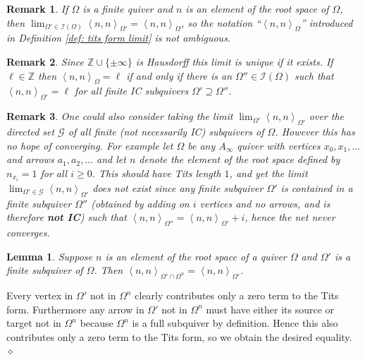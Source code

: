 \documentclass{article}
\newcommand{\ZZ}{\mathbb{Z}}
\newcommand{\bracket}[1]{\left \langle #1 \right\rangle}
\newtheorem{lemma}{Lemma}[section]
\newtheorem{remark}{Remark}[section]
\newenvironment{proof}{\vspace*{2ex}\noindent {\em Proof:}
}{\hfill $\diamond$ \\[2ex]}
\begin{document}
\begin{remark}
    If $\Omega$ is a finite quiver and $n$ is an element of the root space of $\Omega$, then $\lim_{\Omega' \in \mathcal{I}(\Omega)} \bracket{n , n}_{\Omega'} = \bracket{n,n}_{\Omega}$, so the notation ``$\bracket{n,n}_{\Omega}$'' introduced in Definition \ref{def: tits form limit} is not ambiguous.  
\end{remark}

\begin{remark}
  Since $\mathbb{Z} \cup \{ \pm \infty\}$ is Hausdorff this limit is unique if it exists.  If $\ell \in \ZZ$ then $\bracket{n,n}_{\Omega}= \ell$ if and only if there is an $\Omega'' \in\mathcal{I}(\Omega)$ such that $\bracket{n,n}_{\Omega'}= \ell$ for all finite IC subquivers $\Omega' \supseteq \Omega''$. 
\end{remark}


\begin{remark}
One could also consider taking the limit $\lim_{\Omega'} \bracket{n,n}_{\Omega'}$ over the directed set $\mathcal{G}$ of all finite (not necessarily IC) subquivers of $\Omega$. However this has no hope of converging. For example let $\Omega$ be any $A_\infty$ quiver with vertices $x_0, x_1, \ldots$ and arrows $a_1, a_2, \ldots$ and let $n$ denote the element of the root space defined by $n_{x_i} = 1$ for all $i \geq 0$. This should have Tits length $1$, and yet the limit $\lim_{\Omega' \in \mathcal{G}} \bracket{n,n}_{\Omega'}$ does not exist since any finite subquiver $\Omega'$ is contained in a finite subquiver $\Omega''$ (obtained by adding on $i$ vertices and no arrows, and is therefore \textbf{not IC}) such that $\bracket{n,n}_{\Omega''} = \bracket{n,n}_{\Omega'} + i$, hence the net never converges.
\end{remark}

\begin{lemma}\label{lem: tits form computed on support finite}
    Suppose $n$ is an element of the root space of a quiver $\Omega$ and $\Omega'$ is a finite subquiver of $\Omega$. Then $\bracket{n , n}_{\Omega' \cap \Omega^n} = \bracket{n , n}_{\Omega'}$. 
\end{lemma}

\begin{proof}
Every vertex in $\Omega'$ not in $\Omega^n$ clearly contributes only a zero term to the Tits form. Furthermore any arrow in $\Omega'$ not in $\Omega^n$ must have either its source or target not in $\Omega^n$ because $\Omega^n$ is a full subquiver by definition. Hence this also contributes only a zero term to the Tits form, so we obtain the desired equality. 
\end{proof}
\end{document}
